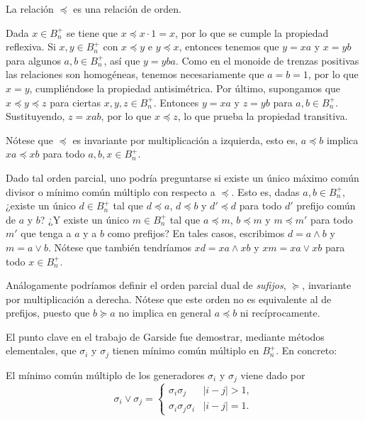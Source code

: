\documentclass[TFG.tex]{subfiles}
\begin{document}
\begin{lemma}
La relación $\preccurlyeq$ es una relación de orden.
\end{lemma}
\begin{dem}
Dada $x\in B_n^+$ se tiene que $x\preccurlyeq x\cdot 1=x$, por lo que se cumple la propiedad reflexiva. Si $x,y\in B_n^+$ con $x \preccurlyeq y $ e $y \preccurlyeq x$, entonces tenemos que $y=xa$ y $x=yb$ para algunos $a,b\in B_n^+$, así que $y=yba$. Como en el monoide de trenzas positivas las relaciones son homogéneas, tenemos necesariamente que $a=b=1$, por lo que $x=y$, cumpliéndose la propiedad antisimétrica. Por último, supongamos que $x\preccurlyeq y\preccurlyeq z$ para ciertas $x,y,z\in B_n^+$. Entonces $y=xa$ y $z=yb$ para $a,b\in B_n^+$. Sustituyendo, $z=xab$, por lo que $x\preccurlyeq z$, lo que prueba la propiedad transitiva. \QED
\end{dem}
Nótese que $\preccurlyeq$ es invariante por multiplicación a izquierda, esto es, $a\preccurlyeq b$ implica $xa\preccurlyeq xb$ para todo $a,b,x\in B_n^+$. %

Dado tal orden parcial, uno podría preguntarse si existe un único máximo común divisor o mínimo común múltiplo con respecto a $\preccurlyeq$. Esto es, dadas $a,b\in B_n^+$, ¿existe un único $d\in B_n^+$ tal que $d\preccurlyeq a$, $d\preccurlyeq b$ y $d'\preccurlyeq d$ para todo $d'$ prefijo común de $a$ y $b$? ¿Y existe un único $m\in B_n^+$ tal que $a\preccurlyeq m$, $b\preccurlyeq m$ y $m\preccurlyeq m'$ para todo $m'$ que tenga a $a$ y a $b$ como prefijos? En tales casos, escribimos $d=a\land b$ y $m=a\lor b$. Nótese que también tendríamos $xd=xa\land xb$ y $xm=xa\lor xb$ para todo $x\in B_n^+$.

\begin{nota}
Análogamente podríamos definir el orden parcial dual  de \emph{sufijos}, $\succcurlyeq$, invariante por multiplicación a derecha. Nótese que este orden no es equivalente al de prefijos, puesto que $b\succcurlyeq a$ no implica en general $a\preccurlyeq b$ ni recíprocamente. 
\end{nota}

El punto clave en el trabajo de Garside fue demostrar, mediante métodos elementales, que $\sigma_i$ y $\sigma_j$ tienen mínimo común múltiplo en $B_n^+$. En concreto:
\begin{prop} 
El mínimo común múltiplo de los generadores $\sigma_i$ y $\sigma_j$ viene dado por
$$\sigma_i\lor\sigma_j=\begin{cases}
\sigma_i\sigma_j & |i-j|>1,\\
\sigma_i\sigma_j\sigma_i & |i-j|=1.
\end{cases}$$
\end{prop}
\end{document}
